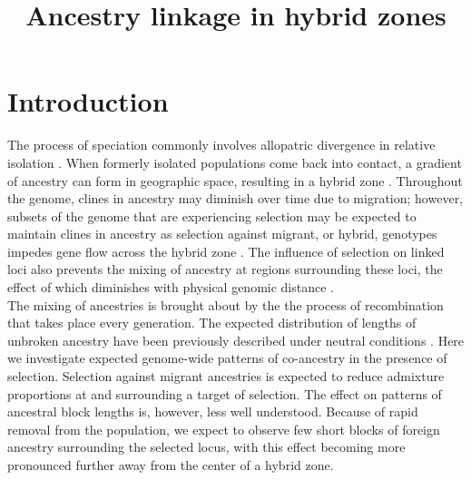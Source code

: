 \documentclass[12pt]{article}
\title{Ancestry linkage in hybrid zones}
\author{}
\date{} %
\begin{document}
\maketitle

\section{Introduction}
The process of speciation commonly involves allopatric divergence in relative isolation \cite{Coyne2004}. When formerly isolated populations come back into contact, a gradient of ancestry can form in geographic space, resulting in a hybrid zone \citep{Barton1985}. Throughout the genome, clines in ancestry may diminish over time due to migration; however, subsets of the genome that are experiencing selection may be expected to maintain clines in ancestry as selection against migrant, or hybrid, genotypes impedes gene flow across the hybrid zone \citep{Barton1979a}. The influence of selection on linked loci also prevents the mixing of ancestry at regions surrounding these loci, the effect of which diminishes with physical genomic distance \citep{Barton1986}.\\

The mixing of ancestries is brought about by the the process of recombination that takes place every generation. The expected distribution of lengths of unbroken ancestry have been previously described under neutral conditions \cite[e.g.][]{Gravel2012,Sedghifar2015}. Here we investigate expected genome-wide patterns of co-ancestry in the presence of selection. Selection against migrant ancestries is expected to reduce admixture proportions at and surrounding a target of selection. The effect on patterns of ancestral block lengths is, however, less well understood. Because of rapid removal from the population, we expect to observe few short blocks of foreign ancestry surrounding the selected locus, with this effect becoming more pronounced further away from the center of a hybrid zone.\\
\end{document}
